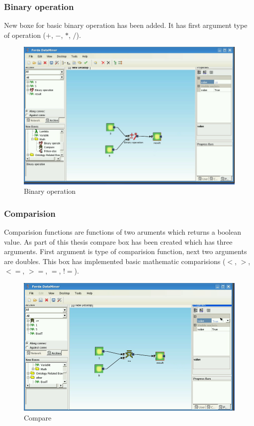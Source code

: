 \documentclass[a4paper,12pt]{book}
\begin{document}
\subsubsection{Binary operation}
New boxe for basic binary operation has been added. It has first argument type of operation ($+$, $-$, $*$, $/$).
\begin{figure}
	\includegraphics[width=12cm]{binaryOperation2.png}
	\caption{Binary operation}
\end{figure}

\subsubsection{Comparision}
Comparision functions are functions of two aruments which returns a boolean value. As part of this thesis compare box has been created which has three arguments. First argument is type of comparision function, next two arguments are doubles. This box has implemented basic mathematic comparisions ($<$, $>$, $<=$, $>=$, $=$, $!=$).
\begin{figure}
\includegraphics[width=12cm]{compare2.png}
	\caption{Compare}
\end{figure}
\end{document}
